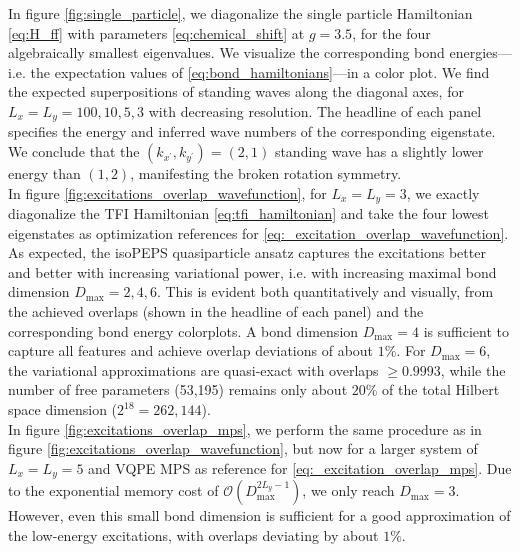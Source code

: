 \noindent In figure \ref{fig:single_particle}, we diagonalize the single particle Hamiltonian \eqref{eq:H_ff} with parameters \eqref{eq:chemical_shift} at $g = 3.5$, for the four algebraically smallest eigenvalues. We visualize the corresponding bond energies---i.e. the expectation values of \eqref{eq:bond_hamiltonians}---in a color plot. We find the expected superpositions of standing waves along the diagonal axes, for $L_x = L_y = 100, 10, 5, 3$ with decreasing resolution. The headline of each panel specifies the energy and inferred wave numbers of the corresponding eigenstate. We conclude that the $(k_{x^{\prime}}, k_{y^{\prime}}) = (2, 1)$ standing wave has a slightly lower energy than $(1, 2)$, manifesting the broken rotation symmetry. \\[0.5em]

\noindent In figure \ref{fig:excitations_overlap_wavefunction}, for $L_x = L_y = 3$, we exactly diagonalize the TFI Hamiltonian \eqref{eq:tfi_hamiltonian} and take the four lowest eigenstates as optimization references for \eqref{eq:_excitation_overlap_wavefunction}. As expected, the isoPEPS quasiparticle ansatz captures the excitations better and better with increasing variational power, i.e. with increasing maximal bond dimension $D_{\text{max}} = 2, 4, 6$. This is evident both quantitatively and visually, from the achieved overlaps (shown in the headline of each panel) and the corresponding bond energy colorplots. A bond dimension $D_{\text{max}} = 4$ is sufficient to capture all features and achieve overlap deviations of about $1\%$. For $D_{\text{max}} = 6$, the variational approximations are quasi-exact with overlaps $\ge 0.9993$, while the number of free parameters (53,195) remains only about $20\%$ of the total Hilbert space dimension ($2^{18} = 262,144$). \\[0.5em]

\noindent In figure \ref{fig:excitations_overlap_mps}, we perform the same procedure as in figure \ref{fig:excitations_overlap_wavefunction}, but now for a larger system of $L_x = L_y = 5$ and VQPE MPS as reference for \eqref{eq:_excitation_overlap_mps}. Due to the exponential memory cost of $\mathcal{O}(D_{\text{max}}^{2 L_y - 1})$, we only reach $D_{\text{max}} = 3$. However, even this small bond dimension is sufficient for a good approximation of the low-energy excitations, with overlaps deviating by about $1\%$.\\[0.5em]


